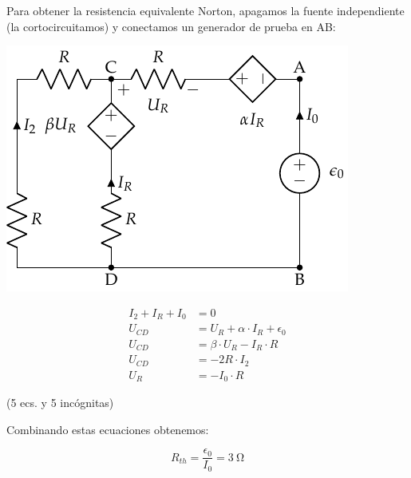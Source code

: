 \vspace{4mm}
Para obtener la resistencia equivalente Norton, apagamos la fuente independiente (la cortocircuitamos) y conectamos un generador de prueba en AB:

\begin{minipage}{0.5\linewidth}
  \hspace{6mm}\includegraphics[width=.9\linewidth]{figuras/norton_fuenteprueba.pdf}
\end{minipage}
\begin{minipage}{0.5\linewidth}
  
  \vspace{-3mm}
  \begin{align*}
    I_2 + I_R + I_0 &= 0\\
    U_{CD} &= U_R + \alpha \cdot I_R + \epsilon_0\\
    U_{CD} &= \beta \cdot U_R - I_R \cdot R\\
    U_{CD} &= -2R\cdot I_2\\
    U_R &= -I_0 \cdot R
  \end{align*}

  \vspace{-4mm}
  \begin{center}
      (5 ecs. y 5 incógnitas)
  \end{center}

  \vspace{-2mm}
  Combinando estas ecuaciones obtenemos:

  \begin{equation*}
    R_{th} = \frac{\epsilon_0}{I_0} = \boxed{\qty{3}{\ohm}}
  \end{equation*}
\end{minipage}

